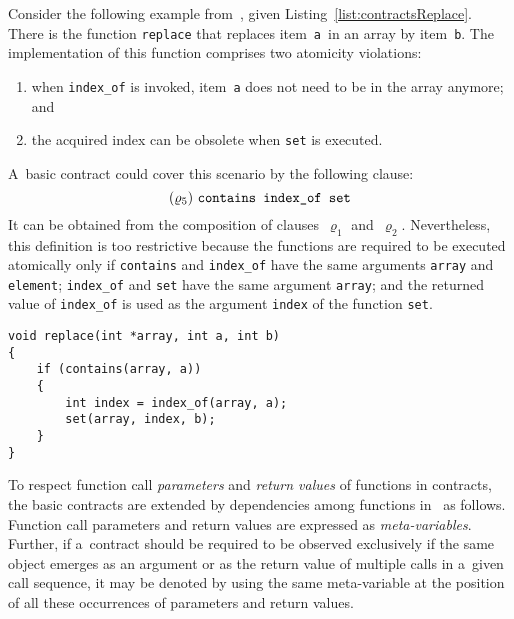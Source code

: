 \begin{example}
    Consider the following example from~\cite{contracts2017, contracts2015}, given Listing~\ref{list:contractsReplace}. There is the function \texttt{replace} that replaces item~\texttt{a}~in an array by item~\texttt{b}. The implementation of this function comprises two atomicity violations:
    \begin{enumerate}
        \item when \texttt{index\_of} is invoked, item~\texttt{a} does not need to be in the array anymore; and

        \item the acquired index can be obsolete when \texttt{set} is executed.
    \end{enumerate}
    A~basic contract could cover this scenario by the following clause:
    $$
        (\varrho_5)\ \text{\texttt{contains index\_of set}}
    $$
    It can be obtained from the composition of clauses~$ \varrho_1 $ and~$ \varrho_2 $. Nevertheless, this definition is too restrictive because the functions are required to be executed atomically only if \texttt{contains} and \texttt{index\_of} have the same arguments \texttt{array} and \texttt{element}; \texttt{index\_of} and \texttt{set} have the same argument \texttt{array}; and the returned value of \texttt{index\_of} is used as the argument \texttt{index} of the function \texttt{set}.
\end{example}

\begin{lstlisting}[style=c, label={list:contractsReplace}, float=hbt, caption={An example of an atomicity violation with \emph{data dependencies}~\cite{contracts2017, contracts2015}}]
void replace(int *array, int a, int b)
{
    if (contains(array, a))
    {
        int index = index_of(array, a);
        set(array, index, b);
    }
}
\end{lstlisting}

To respect function call \emph{parameters} and \emph{return values} of functions in contracts, the basic contracts are extended by dependencies among functions in~\cite{contracts2017, contracts2015} as follows. Function call parameters and return values are expressed as \emph{meta-variables}. Further, if a~contract should be required to be observed exclusively if the same object emerges as an argument or as the return value of multiple calls in a~given call sequence, it may be denoted by using the same meta-variable at the position of all these occurrences of parameters and return values.


